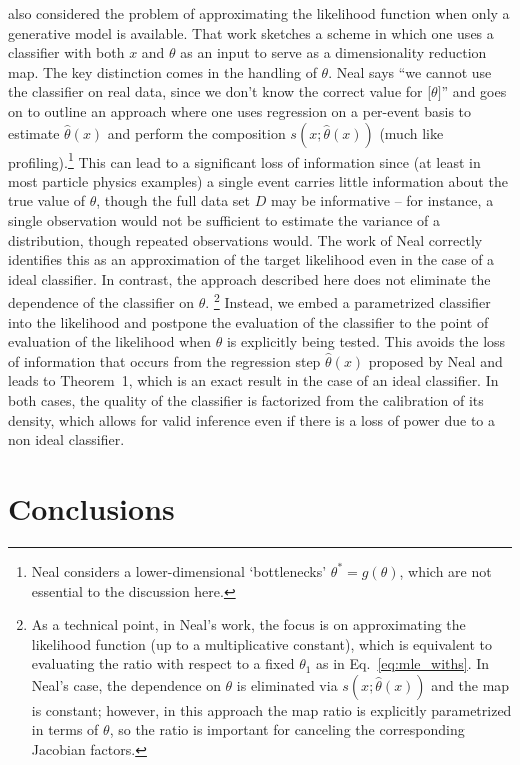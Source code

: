 \documentclass[12pt]{article}
\numberwithin{equation}{section}
\theoremstyle{plain}
\begin{document}
\cite{Neal:2007zz} also considered the problem of approximating the likelihood function when only a generative model is available. That work sketches a scheme in which one uses a classifier with both $x$ and $\theta$ as an input to serve as a dimensionality reduction map.
The key distinction comes in the handling of $\theta$.  Neal says  ``we cannot use the classifier on real data, since we don't know the correct value for [$\theta]$'' and goes on to outline an approach where one uses regression on a per-event basis to estimate $\hat{\theta}(x)$ and perform the composition $s(x; \hat{\theta}(x))$ (much like profiling).\footnote{Neal considers a lower-dimensional `bottlenecks' $\theta^*=g(\theta)$, which are not essential to the discussion here.}  This can lead to a significant loss of information since (at least in most particle physics examples) a single event carries little information about the true value of $\theta$, though the full data set $D$ may be informative -- for instance, a single observation would not be sufficient to estimate the variance of a distribution, though repeated observations would.  The work of Neal correctly identifies this as an approximation of the target likelihood even in the case of a ideal classifier. In contrast, the approach described here does not eliminate the dependence of the classifier on $\theta$.%
\footnote{As a technical point, in Neal's work, the focus is on approximating the likelihood function (up to a multiplicative constant), which is equivalent to evaluating the ratio  with respect to a fixed $\theta_1$ as in Eq.~\ref{eq:mle_withs}. In Neal's case, the dependence on $\theta$ is eliminated via $s(x; \hat{\theta}(x))$ and the map is constant; however, in this approach the map ratio is explicitly parametrized in terms of $\theta$, so the ratio is important for canceling the corresponding Jacobian factors.} Instead, we embed a parametrized classifier into the likelihood and postpone the evaluation of the classifier to the point of evaluation of the likelihood when $\theta$ is explicitly being tested. This avoids the loss of information that occurs from the regression step $\hat{\theta}(x)$ proposed by Neal and leads to Theorem~1, which is an exact result in the case of an ideal classifier. In both cases, the quality of the classifier is factorized from the calibration of its density, which allows for valid inference even if there is a loss of power due to a non ideal classifier.



\section{Conclusions}
\end{document}
